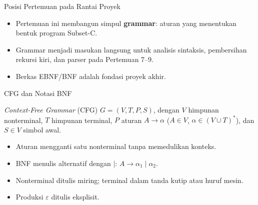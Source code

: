\documentclass[aspectratio=169,10pt,t]{beamer}
\begin{document}
\begin{frame}{Posisi Pertemuan pada Rantai Proyek}

  \vspace{2pt}
  \begin{itemize}
    \item Pertemuan ini membangun simpul \textbf{grammar}: aturan yang
          menentukan bentuk program Subset-C.
    \item Grammar menjadi masukan langsung untuk analisis sintaksis,
          pembersihan rekursi kiri, dan parser pada Pertemuan 7--9.
    \item Berkas EBNF/BNF adalah fondasi proyek akhir.
  \end{itemize}
\end{frame}

\begin{frame}{CFG dan Notasi BNF}
  \begin{block}{\textit{Context-Free Grammar} (CFG)}
    \small
    \(G=(V,T,P,S)\), dengan \(V\) himpunan nonterminal, \(T\) himpunan
    terminal, \(P\) aturan \(A \to \alpha\) (\(A \in V\),
    \(\alpha \in (V \cup T)^{*}\)), dan \(S \in V\) simbol awal.
  \end{block}

  \begin{itemize}
    \item Aturan mengganti satu nonterminal tanpa memedulikan konteks.
    \item BNF menulis alternatif dengan \(\mid\):
          \(A \to \alpha_1 \mid \alpha_2\).
    \item Nonterminal ditulis miring; terminal dalam tanda kutip atau
          huruf mesin.
    \item Produksi \(\varepsilon\) ditulis eksplisit.
  \end{itemize}
\end{frame}
\end{document}
